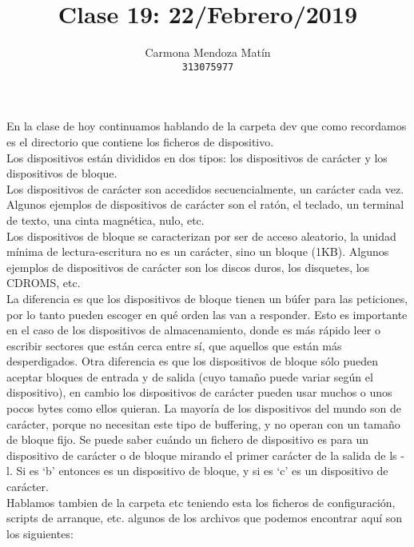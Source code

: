 \documentclass[11pt, a4paper]{report}
\begin{document}
\title{Clase 19: 22/Febrero/2019}
\author{
  Carmona Mendoza Mat\'in\\
  \texttt{313075977}
}
\date{}
\maketitle

En la clase de hoy continuamos hablando de la carpeta dev que como recordamos
es el directorio que contiene los ficheros de dispositivo. \\

Los dispositivos están divididos en dos tipos: los dispositivos de carácter y
los dispositivos de bloque. \\

Los dispositivos de carácter son accedidos secuencialmente, un carácter cada
vez. Algunos ejemplos de dispositivos de carácter son el ratón, el teclado,
un terminal de texto, una cinta magnética, nulo, etc. \\

Los dispositivos de bloque se caracterizan por ser de acceso aleatorio, la
unidad mínima de lectura-escritura no es un carácter, sino un bloque (1KB).
Algunos ejemplos de dispositivos de carácter son los discos duros, los
disquetes, los CDROMS, etc. \\

La diferencia es que los dispositivos de bloque tienen un búfer para las
peticiones, por lo tanto pueden escoger en qué orden las van a responder. Esto
es importante en el caso de los dispositivos de almacenamiento, donde es más
rápido leer o escribir sectores que están cerca entre sí, que aquellos que
están más desperdigados. Otra diferencia es que los dispositivos de bloque
sólo pueden aceptar bloques de entrada y de salida (cuyo tamaño puede variar
según el dispositivo), en cambio los dispositivos de carácter pueden usar
muchos o unos pocos bytes como ellos quieran. La mayoría de los dispositivos
del mundo son de carácter, porque no necesitan este tipo de buffering, y no
operan con un tamaño de bloque fijo. Se puede saber cuándo un fichero de
dispositivo es para un dispositivo de carácter o de bloque mirando el primer
carácter de la salida de ls -l. Si es `b' entonces es un dispositivo de
bloque, y si es `c' es un dispositivo de carácter. \\

Hablamos tambien de la carpeta etc teniendo esta los ficheros de configuración,
scripts de arranque, etc. algunos de los archivos que podemos encontrar aquí
son los siguientes: \\
\end{document}
